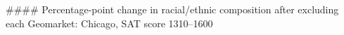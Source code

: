 #### Percentage-point change in racial/ethnic composition after excluding each Geomarket: Chicago, SAT score 1310–1600
